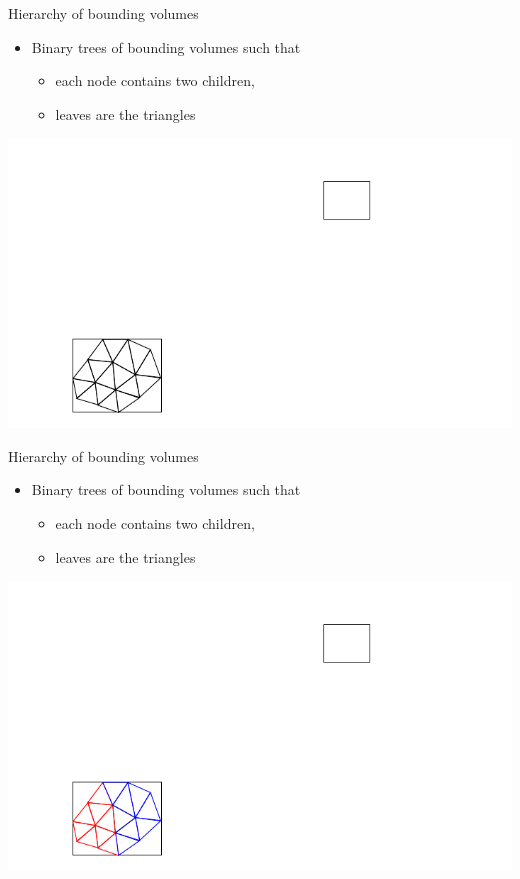 \begin{frame} {Hierarchy of bounding volumes}
  \begin{itemize}
  \item Binary trees of bounding volumes such that
    \begin{itemize}
    \item each node contains two children,
    \item leaves are the triangles
    \end{itemize}
  \end{itemize}
  \centerline {
    \includegraphics[width=.8\linewidth]{figures/bvh2.pdf}
  }
\end{frame}

\begin{frame} {Hierarchy of bounding volumes}
  \begin{itemize}
  \item Binary trees of bounding volumes such that
    \begin{itemize}
    \item each node contains two children,
    \item leaves are the triangles
    \end{itemize}
  \end{itemize}
  \centerline {
    \includegraphics[width=.8\linewidth]{figures/bvh3.pdf}
  }
\end{frame}

